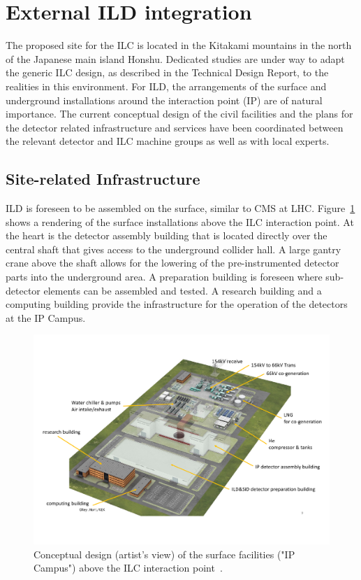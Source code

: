 \section{External ILD integration}
\label{ild:sec:external_integration}

The proposed site for the ILC is located in the Kitakami mountains in the north of the Japanese main island Honshu. Dedicated studies are under way to adapt the generic ILC design, as described in the Technical Design Report, to the realities in this environment. For ILD, the arrangements of the surface and underground installations around the interaction point (IP) are of natural importance. The current conceptual design of the civil facilities and the plans for the detector related infrastructure and services have been coordinated between the relevant detector and ILC machine groups as well as with local experts.

\subsection{Site-related Infrastructure}

ILD is foreseen to be assembled on the surface, similar to CMS at LHC. Figure~\ref{fig:integration:surface} shows a rendering of the surface installations above the ILC interaction point. At the heart is the detector assembly building that is located directly over the central shaft that gives access to the underground collider hall. A large gantry crane above the shaft allows for the lowering of the pre-instrumented detector parts into the underground area. A preparation building is foreseen where sub-detector elements can be assembled and tested. A research building and a computing building provide the infrastructure for the operation of the detectors at the IP Campus. 

\begin{figure}[htbp]
\includegraphics[width=0.9\hsize]{Integration/fig/Surface_Facilities.pdf}
\caption{\label{fig:integration:surface}Conceptual design (artist's view) of the surface facilities ("IP Campus") above the ILC interaction point~\cite{ild:bib:surface_facilities}. }
\end{figure}

